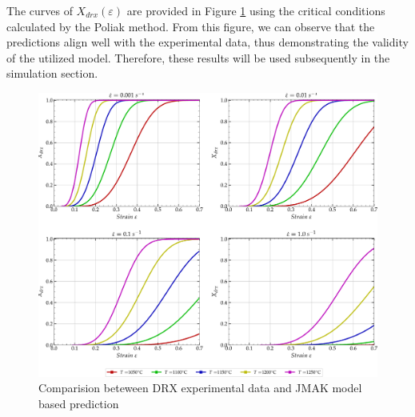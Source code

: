 \documentclass[metals,article,submit,pdftex,moreauthors]{Definitions/mdpi}
\DeclareRobustCommand{\mdot}[1]{\accentset{\mbox{\bfseries .}}{#1}}
\DeclareRobustCommand{\RMSE}{\text{E}_\text{RMS}}
\DeclareRobustCommand{\MARE}{\text{E}_\text{MAR}}
\DeclareRobustCommand{\MPa}{\text{MPa}}
\begin{document}
The curves of $X_{drx}(\varepsilon)$ are provided in Figure \ref{fig:nDRX} using the critical conditions calculated by the Poliak method. From this figure, we can observe that the predictions align well with the experimental data, thus demonstrating the validity of the utilized model. Therefore, these results will be used subsequently in the simulation section.
\begin{figure}[H]
\centering
\includegraphics[width=0.99\columnwidth]{Figures/nDRX}
\caption{Comparision beteween DRX experimental data and JMAK model based prediction}
\label{fig:nDRX}
\end{figure}

\end{document}

